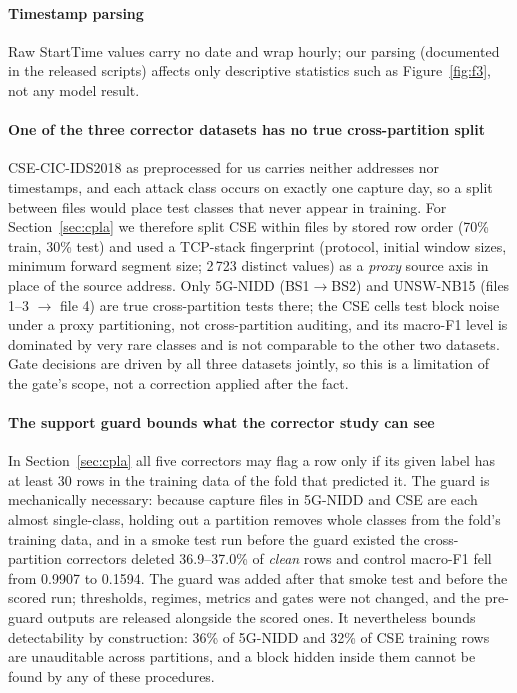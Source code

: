 \documentclass[preprint,12pt]{elsarticle}
\begin{document}
\paragraph{Timestamp parsing} Raw StartTime values carry no date and wrap
hourly; our parsing (documented in the released scripts) affects only
descriptive statistics such as Figure~\ref{fig:f3}, not any model result.

\paragraph{One of the three corrector datasets has no true cross-partition split}
CSE-CIC-IDS2018 as preprocessed for us carries neither addresses nor timestamps,
and each attack class occurs on exactly one capture day, so a split between
files would place test classes that never appear in training. For
Section~\ref{sec:cpla} we therefore split CSE within files by stored row order
(70\% train, 30\% test) and used a TCP-stack fingerprint (protocol, initial
window sizes, minimum forward segment size; 2\,723 distinct values) as a
\emph{proxy} source axis in place of the source address. Only 5G-NIDD
(BS1$\to$BS2) and UNSW-NB15 (files 1--3 $\to$ file 4) are true cross-partition
tests there; the CSE cells test block noise under a proxy partitioning, not
cross-partition auditing, and its macro-F1 level is dominated by very rare
classes and is not comparable to the other two datasets. Gate decisions are
driven by all three datasets jointly, so this is a limitation of the gate's
scope, not a correction applied after the fact.

\paragraph{The support guard bounds what the corrector study can see} In
Section~\ref{sec:cpla} all five correctors may flag a row only if its given
label has at least 30 rows in the training data of the fold that predicted it.
The guard is mechanically necessary: because capture files in 5G-NIDD and CSE
are each almost single-class, holding out a partition removes whole classes from
the fold's training data, and in a smoke test run before the guard existed the
cross-partition correctors deleted 36.9--37.0\% of \emph{clean} rows and control
macro-F1 fell from 0.9907 to 0.1594. The guard was added after that smoke test
and before the scored run; thresholds, regimes, metrics and gates were not
changed, and the pre-guard outputs are released alongside the scored ones. It
nevertheless bounds detectability by construction: 36\% of 5G-NIDD and 32\% of
CSE training rows are unauditable across partitions, and a block hidden inside
them cannot be found by any of these procedures.
\end{document}
